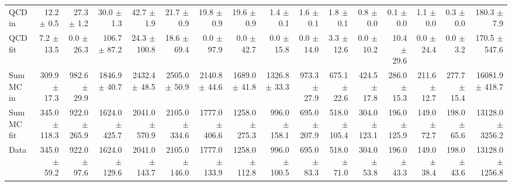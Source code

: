 \begin{table}[htbp]
{\begin{tabular}{lrrrrrrrrrrrrrrr}
\hline
QCD in & 12.2 $\pm$ 0.5 & 27.3 $\pm$ 1.2 & 30.0 $\pm$ 1.3 & 42.7 $\pm$ 1.9 & 21.7 $\pm$ 0.9 & 19.8 $\pm$ 0.9 & 19.6 $\pm$ 0.9 & 1.4 $\pm$ 0.1 & 1.6 $\pm$ 0.1 & 1.8 $\pm$ 0.1 & 0.8 $\pm$ 0.0 & 0.1 $\pm$ 0.0 & 1.1 $\pm$ 0.0 & 0.3 $\pm$ 0.0 & 180.3 $\pm$ 7.9 \\
QCD fit & 7.2 $\pm$ 13.5 & 0.0 $\pm$ 26.3 & 106.7 $\pm$ 87.2 & 24.3 $\pm$ 100.8 & 18.6 $\pm$ 69.4 & 0.0 $\pm$ 97.9 & 0.0 $\pm$ 42.7 & 0.0 $\pm$ 15.8 & 0.0 $\pm$ 14.0 & 3.3 $\pm$ 12.6 & 0.0 $\pm$ 10.2 & 10.4 $\pm$ 29.6 & 0.0 $\pm$ 24.4 & 0.0 $\pm$ 3.2 & 170.5 $\pm$ 547.6 \\
\hline
Sum MC in & 309.9 $\pm$ 17.3 & 982.6 $\pm$ 29.9 & 1846.9 $\pm$ 40.7 & 2432.4 $\pm$ 48.5 & 2505.0 $\pm$ 50.9 & 2140.8 $\pm$ 44.6 & 1689.0 $\pm$ 41.8 & 1326.8 $\pm$ 33.3 & 973.3 $\pm$ 27.9 & 675.1 $\pm$ 22.6 & 424.5 $\pm$ 17.8 & 286.0 $\pm$ 15.3 & 211.6 $\pm$ 12.7 & 277.7 $\pm$ 15.4& 16081.9 $\pm$ 418.7 \\
Sum MC fit & 345.0 $\pm$ 118.3 & 922.0 $\pm$ 265.9 & 1624.0 $\pm$ 425.7 & 2041.0 $\pm$ 570.9 & 2105.0 $\pm$ 334.6 & 1777.0 $\pm$ 406.6 & 1258.0 $\pm$ 275.3 & 996.0 $\pm$ 158.1 & 695.0 $\pm$ 207.9 & 518.0 $\pm$ 105.4 & 304.0 $\pm$ 123.1 & 196.0 $\pm$ 125.9 & 149.0 $\pm$ 72.7 & 198.0 $\pm$ 65.6 & 13128.0 $\pm$ 3256.2 \\
\hline
Data & 345.0 $\pm$ 59.2 & 922.0 $\pm$ 97.6 & 1624.0 $\pm$ 129.6 & 2041.0 $\pm$ 143.7 & 2105.0 $\pm$ 146.0 & 1777.0 $\pm$ 133.9 & 1258.0 $\pm$ 112.8 & 996.0 $\pm$ 100.5 & 695.0 $\pm$ 83.3 & 518.0 $\pm$ 71.0 & 304.0 $\pm$ 53.8 & 196.0 $\pm$ 43.3 & 149.0 $\pm$ 38.4 & 198.0 $\pm$ 43.6 & 13128.0 $\pm$ 1256.8 \\
\hline
\end{tabular}
}
\end{table}
